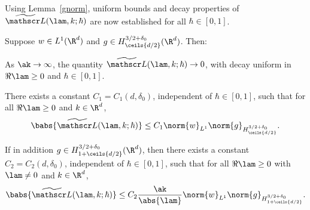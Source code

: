Using Lemma~\ref{gnorm}, uniform bounds and decay properties of \( \widetilde{\mathscr L}(\lam,k;\hbar) \) are now established for all \( \hbar \in [0,1] \).

\pagebreak[2]
\begin{lemma}\label{boundedness and decay lemma}
Suppose $w\in L^1(\R^d)$ and $g\in H^{3/2+\delta_0}_{\ceils{d/2}}(\R^d)$. Then:\vspace*{-3pt}
\begin{enumeratea}
\item \label{(a)} As $\ak\to\infty$, the quantity $\widetilde {\mathscr L}(\lam,k;\hbar)\to0$, with decay uniform in $\Re\lam\geq0$ and $\hbar\in[0,1]$.

\item \label{(b)}There exists a constant $C_1=C_1(d,\delta_0)$, independent of $\hbar\in [0,1]$, such that for all $\Re\lam\geq0$ and $k\in\R^d$,\vspace*{-3pt}
\begin{align*}
\babs{\widetilde {\mathscr L}(\lam,k;\hbar)}\leq C_1\norm{w}_{L^1}\norm{g}_{H^{3/2+\delta_0}_{\ceils{d/2}}}.
\end{align*}
\item \label{(c)} If in addition $g\in H^{3/2+\delta_0}_{1+\ceils{d/2}}(\R^d)$, then there exists a constant $C_2=C_2(d,\delta_0)$, independent of $\hbar\in [0,1]$, such that for all $\Re\lam\geq0$ with $\lam\neq0$ and $k\in\R^d$,\vspace*{-3pt}
\begin{align*}
\babs{\widetilde {\mathscr L}(\lam,k;\hbar)}\leq C_2\frac{\ak}{\abs{\lam}}\norm{w}_{L^1}\norm{g}_{H^{3/2+\delta_0}_{1+\ceils{d/2}}}.
\end{align*}
\end{enumeratea}
\end{lemma}
